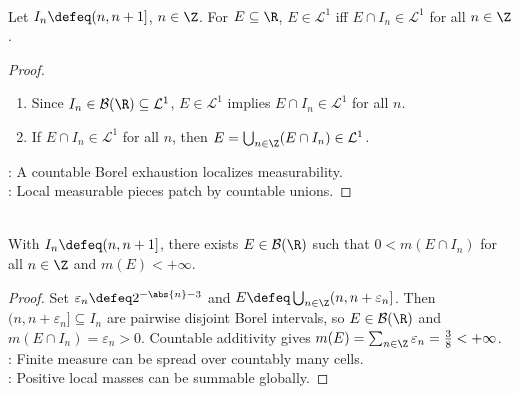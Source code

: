 \begin{proposition} \label{prop:real-line-local-measurability-unit-intervals} \\
Let $I_n\defeq(n,n+1]$, $n\in\Z$. For $E\subseteq\R$, $E\in\mathcal{L}^1$ iff $E\cap I_n\in\mathcal{L}^1$ for all $n\in\Z$.
\begin{proof}
\begin{enumerate}[label=\roman*.]
\setlength{\itemsep}{0pt}
\item[$(\Rightarrow)$] Since $I_n\in\mathcal{B}(\R)\subseteq\mathcal{L}^1$, $E\in\mathcal{L}^1$ implies $E\cap I_n\in\mathcal{L}^1$ for all $n$.
\item[$(\Leftarrow)$] If $E\cap I_n\in\mathcal{L}^1$ for all $n$, then $E=\bigcup_{n\in\Z}(E\cap I_n)\in\mathcal{L}^1$.
\end{enumerate}
: A countable Borel exhaustion localizes measurability.\\
: Local measurable pieces patch by countable unions.
\end{proof}
\end{proposition}

\begin{proposition} \label{prop:finite-measure-meets-every-unit-interval} \\
With $I_n\defeq(n,n+1]$, there exists $E\in\mathcal{B}(\R)$ such that $0<m(E\cap I_n)$ for all $n\in\Z$ and $m(E)<+\infty$.
\begin{proof}
Set $\varepsilon_n\defeq2^{-\abs{n}-3}$ and $E\defeq\bigcup_{n\in\Z}(n,n+\varepsilon_n]$. Then $(n,n+\varepsilon_n]\subseteq I_n$ are pairwise disjoint Borel intervals, so $E\in\mathcal{B}(\R)$ and $m(E\cap I_n)=\varepsilon_n>0$. Countable additivity gives $m(E)=\sum_{n\in\Z}\varepsilon_n=\frac38<+\infty$.\\
: Finite measure can be spread over countably many cells.\\
: Positive local masses can be summable globally.
\end{proof}
\end{proposition}

